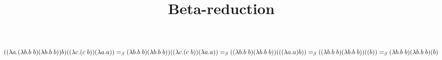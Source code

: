 \documentclass{article}
\title{Beta-reduction}
\begin{document}
\maketitle
$((\lambda a.(\lambda b.b\;b)(\lambda b.b\;b))b)((\lambda c.(c\;b))(\lambda a.a))=_\beta\\
(\lambda b.b\;b)(\lambda b.b\;b))((\lambda c.(c\;b))(\lambda a.a))=_\beta((\lambda b.b\;b)(\lambda b.b\;b))(((\lambda a.a)b))=_\beta\\ 
((\lambda b.b\;b)(\lambda b.b\;b))((b))=_\beta(\lambda b.b\;b)(\lambda b.b\;b)(b)
$
\end{document}
